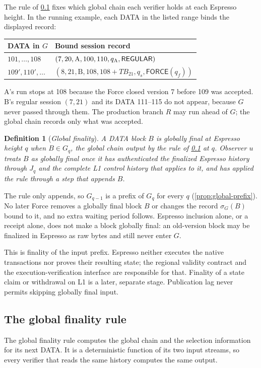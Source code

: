 \documentclass[11pt,a4paper]{article}
\newcommand{\TB}{\mathit{TB}}
\newcommand{\tagg}[1]{\ensuremath{\mathsf{#1}}}
\newcommand{\defterm}[1]{\textcolor{rrBlue}{\textit{#1}}}
\newtheorem{definition}{Definition}[section]
\begin{document}
The rule of \cref{sec:exports} fixes which global chain each verifier
holds at each Espresso height. In the running example, each DATA in the
listed range binds the displayed record:
\begin{center}\small
\begin{tabular}{@{}ll@{}}\toprule
DATA in $G$ & Bound session record\\\midrule
$101,\ldots,108$ & $(7,20,\text{A},100,110,q_{\rm A},\tagg{REGULAR})$\\
$109',110',\ldots$ & $(8,21,\text{B},108,108+\TB_{21},q_s,\tagg{FORCE}(q_f))$\\\bottomrule
\end{tabular}
\end{center}
A's run stops at 108 because the Force closed version 7 before 109
was accepted. B's regular session $(7,21)$ and its DATA 111--115 do not
appear, because $G$ never passed through them. The production branch
$R$ may run ahead of $G$; the global chain records only what was
accepted.

\begin{definition}[\defterm{Global finality}]
\label{def:global-finality}
A DATA block $B$ is \defterm{globally final at Espresso height $q$} when
$B\in G_q$, the global chain output by the rule of \cref{sec:exports} at
$q$. Observer $u$ treats $B$ as globally final once it has authenticated
the finalized Espresso history through $J_q$ and the complete L1 control
history that applies to it, and has applied the rule through a step that
appends $B$.
\end{definition}

The rule only appends, so $G_{q-1}$ is a prefix of $G_q$ for every $q$
(\cref{prop:global-prefix}). No later Force removes a globally final
block $B$ or changes the record $\sigma_G(B)$ bound to it, and no extra waiting period
follows. Espresso inclusion alone, or a receipt alone, does not make a
block globally final: an old-version block may be finalized in Espresso
as raw bytes and still never enter $G$.

This is finality of the input prefix. Espresso neither executes the
native transactions nor proves their resulting state; the regional
validity contract and the execution-verification interface are
responsible for that. Finality of a state claim or withdrawal on L1 is a
later, separate stage. Publication lag never permits skipping globally
final input.

\subsection{The global finality rule}
\label{sec:exports}
The global finality rule computes the global chain and the selection
information for its next DATA. It is a deterministic function of its
two input streams, so every verifier that reads the same history
computes the same output.
\end{document}
